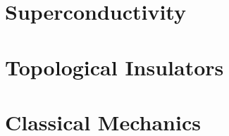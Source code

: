 \documentclass[mathserif]{beamer}
\begin{document}
	\color{white}
	
	
	
	
	
	\section{Superconductivity}
	
	
	
	\section{Topological Insulators}
	
	
	
	
	\section{Classical Mechanics}
	
	
	
\end{document}
